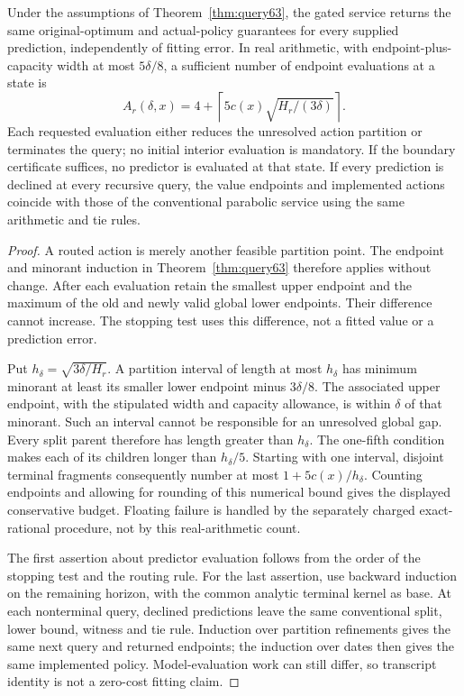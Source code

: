 \begin{theorem}\label{thm:gated64}
Under the assumptions of Theorem~\ref{thm:query63}, the gated service returns the same original-optimum and actual-policy guarantees for every supplied prediction, independently of fitting error. In real arithmetic, with endpoint-plus-capacity width at most $5\delta/8$, a sufficient number of endpoint evaluations at a state is
\[
 A_r(\delta,x)=4+\left\lceil5c(x)\sqrt{H_r/(3\delta)}\right\rceil.
\]
Each requested evaluation either reduces the unresolved action partition or terminates the query; no initial interior evaluation is mandatory. If the boundary certificate suffices, no predictor is evaluated at that state. If every prediction is declined at every recursive query, the value endpoints and implemented actions coincide with those of the conventional parabolic service using the same arithmetic and tie rules.
\end{theorem}
\begin{proof}
A routed action is merely another feasible partition point. The endpoint and minorant induction in Theorem~\ref{thm:query63} therefore applies without change. After each evaluation retain the smallest upper endpoint and the maximum of the old and newly valid global lower endpoints. Their difference cannot increase. The stopping test uses this difference, not a fitted value or a prediction error.

Put $h_\delta=\sqrt{3\delta/H_r}$. A partition interval of length at most $h_\delta$ has minimum minorant at least its smaller lower endpoint minus $3\delta/8$. The associated upper endpoint, with the stipulated width and capacity allowance, is within $\delta$ of that minorant. Such an interval cannot be responsible for an unresolved global gap. Every split parent therefore has length greater than $h_\delta$. The one-fifth condition makes each of its children longer than $h_\delta/5$. Starting with one interval, disjoint terminal fragments consequently number at most $1+5c(x)/h_\delta$. Counting endpoints and allowing for rounding of this numerical bound gives the displayed conservative budget. Floating failure is handled by the separately charged exact-rational procedure, not by this real-arithmetic count.

The first assertion about predictor evaluation follows from the order of the stopping test and the routing rule. For the last assertion, use backward induction on the remaining horizon, with the common analytic terminal kernel as base. At each nonterminal query, declined predictions leave the same conventional split, lower bound, witness and tie rule. Induction over partition refinements gives the same next query and returned endpoints; the induction over dates then gives the same implemented policy. Model-evaluation work can still differ, so transcript identity is not a zero-cost fitting claim.
\end{proof}

